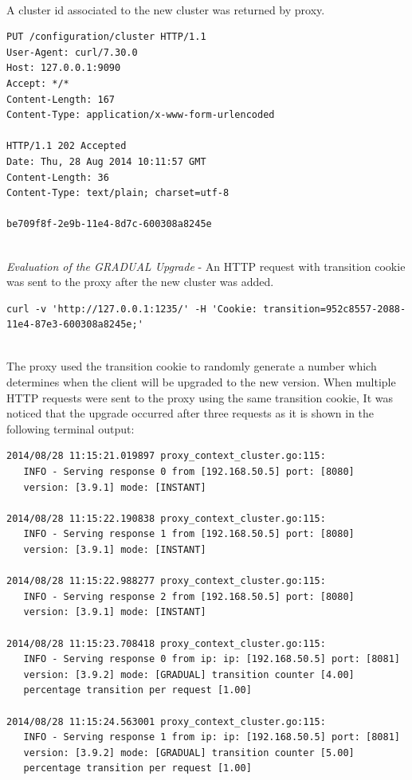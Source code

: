 \documentclass[a4paper,11pt,twoside]{report}
\begin{document}
\noindent\\ 
A cluster id associated to the new cluster was returned by proxy.\smallskip

\begin{lstlisting}[language=terminal]
PUT /configuration/cluster HTTP/1.1
User-Agent: curl/7.30.0
Host: 127.0.0.1:9090
Accept: */*
Content-Length: 167
Content-Type: application/x-www-form-urlencoded
 
HTTP/1.1 202 Accepted
Date: Thu, 28 Aug 2014 10:11:57 GMT
Content-Length: 36
Content-Type: text/plain; charset=utf-8
 
be709f8f-2e9b-11e4-8d7c-600308a8245e
\end{lstlisting}

\noindent\\
\textit{Evaluation of the GRADUAL Upgrade} - An HTTP request with transition cookie was sent to the proxy after the new cluster was added.\smallskip

\begin{lstlisting}[language=terminal]
curl -v 'http://127.0.0.1:1235/' -H 'Cookie: transition=952c8557-2088-11e4-87e3-600308a8245e;'
\end{lstlisting}

\noindent\\
The proxy used the transition cookie to randomly generate a number which determines when the client will be upgraded to the new version. When multiple HTTP requests were sent to the proxy using the same transition cookie, It was noticed that the upgrade occurred after three requests as it is shown in the following terminal output: \smallskip

\begin{lstlisting}[language=terminal]
2014/08/28 11:15:21.019897 proxy_context_cluster.go:115:     
   INFO - Serving response 0 from [192.168.50.5] port: [8080] 
   version: [3.9.1] mode: [INSTANT]

2014/08/28 11:15:22.190838 proxy_context_cluster.go:115:     
   INFO - Serving response 1 from [192.168.50.5] port: [8080] 
   version: [3.9.1] mode: [INSTANT]

2014/08/28 11:15:22.988277 proxy_context_cluster.go:115:     
   INFO - Serving response 2 from [192.168.50.5] port: [8080] 
   version: [3.9.1] mode: [INSTANT]

2014/08/28 11:15:23.708418 proxy_context_cluster.go:115:     
   INFO - Serving response 0 from ip: ip: [192.168.50.5] port: [8081] 
   version: [3.9.2] mode: [GRADUAL] transition counter [4.00] 
   percentage transition per request [1.00]
   
2014/08/28 11:15:24.563001 proxy_context_cluster.go:115:     
   INFO - Serving response 1 from ip: ip: [192.168.50.5] port: [8081] 
   version: [3.9.2] mode: [GRADUAL] transition counter [5.00] 
   percentage transition per request [1.00]
\end{lstlisting}
\end{document}
